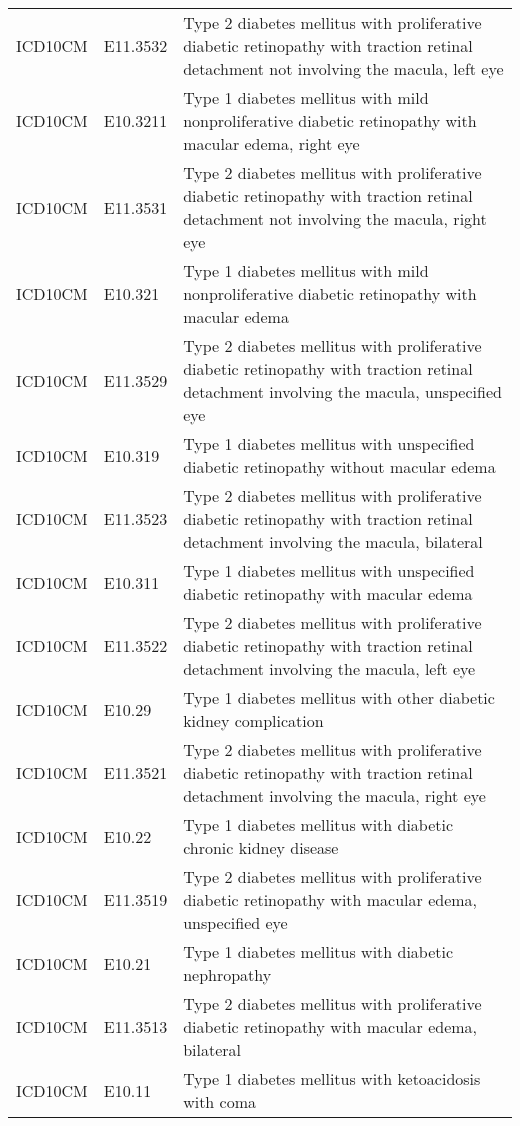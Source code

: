 \begin{table}[ht]
\begin{tabular}{lll}
  ICD10CM & E11.3532 & Type 2 diabetes mellitus with proliferative diabetic retinopathy with traction retinal detachment not involving the macula, left eye \\ 
  ICD10CM & E10.3211 & Type 1 diabetes mellitus with mild nonproliferative diabetic retinopathy with macular edema, right eye \\ 
  ICD10CM & E11.3531 & Type 2 diabetes mellitus with proliferative diabetic retinopathy with traction retinal detachment not involving the macula, right eye \\ 
  ICD10CM & E10.321 & Type 1 diabetes mellitus with mild nonproliferative diabetic retinopathy with macular edema \\ 
  ICD10CM & E11.3529 & Type 2 diabetes mellitus with proliferative diabetic retinopathy with traction retinal detachment involving the macula, unspecified eye \\ 
  ICD10CM & E10.319 & Type 1 diabetes mellitus with unspecified diabetic retinopathy without macular edema \\ 
  ICD10CM & E11.3523 & Type 2 diabetes mellitus with proliferative diabetic retinopathy with traction retinal detachment involving the macula, bilateral \\ 
  ICD10CM & E10.311 & Type 1 diabetes mellitus with unspecified diabetic retinopathy with macular edema \\ 
  ICD10CM & E11.3522 & Type 2 diabetes mellitus with proliferative diabetic retinopathy with traction retinal detachment involving the macula, left eye \\ 
  ICD10CM & E10.29 & Type 1 diabetes mellitus with other diabetic kidney complication \\ 
  ICD10CM & E11.3521 & Type 2 diabetes mellitus with proliferative diabetic retinopathy with traction retinal detachment involving the macula, right eye \\ 
  ICD10CM & E10.22 & Type 1 diabetes mellitus with diabetic chronic kidney disease \\ 
  ICD10CM & E11.3519 & Type 2 diabetes mellitus with proliferative diabetic retinopathy with macular edema, unspecified eye \\ 
  ICD10CM & E10.21 & Type 1 diabetes mellitus with diabetic nephropathy \\ 
  ICD10CM & E11.3513 & Type 2 diabetes mellitus with proliferative diabetic retinopathy with macular edema, bilateral \\ 
  ICD10CM & E10.11 & Type 1 diabetes mellitus with ketoacidosis with coma \\ 

\end{tabular}
\end{table}
